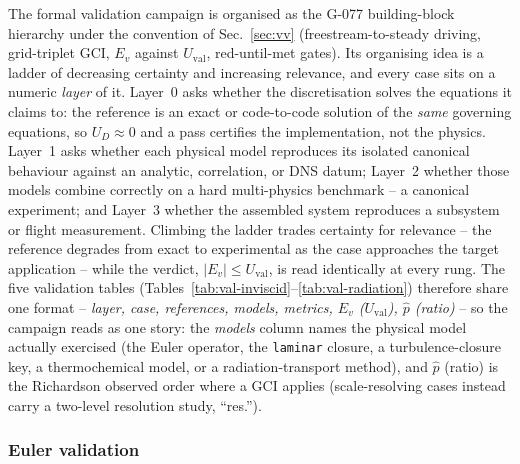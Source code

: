 \documentclass[journal,biblatex]{new-aiaa}
\newcommand{\Field}[1]{\texttt{#1}}
\begin{document}
The formal validation campaign is organised as the G-077 building-block hierarchy under the convention of Sec.~\ref{sec:vv} (freestream-to-steady driving, grid-triplet GCI, $E_v$ against $U_{\mathrm{val}}$, red-until-met gates). Its organising idea is a ladder of decreasing certainty and increasing relevance, and every case sits on a numeric \emph{layer} of it. Layer~0 asks whether the discretisation solves the equations it claims to: the reference is an exact or code-to-code solution of the \emph{same} governing equations, so $U_D\approx0$ and a pass certifies the implementation, not the physics. Layer~1 asks whether each physical model reproduces its isolated canonical behaviour against an analytic, correlation, or DNS datum; Layer~2 whether those models combine correctly on a hard multi-physics benchmark -- a canonical experiment; and Layer~3 whether the assembled system reproduces a subsystem or flight measurement. Climbing the ladder trades certainty for relevance -- the reference degrades from exact to experimental as the case approaches the target application -- while the verdict, $|E_v|\le U_{\mathrm{val}}$, is read identically at every rung. The five validation tables (Tables~\ref{tab:val-inviscid}--\ref{tab:val-radiation}) therefore share one format -- \emph{layer, case, references, models, metrics, $E_v$ ($U_{\mathrm{val}}$), $\hat p$ (ratio)} -- so the campaign reads as one story: the \emph{models} column names the physical model actually exercised (the Euler operator, the \Field{laminar} closure, a turbulence-closure key, a thermochemical model, or a radiation-transport method), and $\hat p$ (ratio) is the Richardson observed order where a GCI applies (scale-resolving cases instead carry a two-level resolution study, ``res.'').

\subsubsection{Euler validation}
\end{document}
